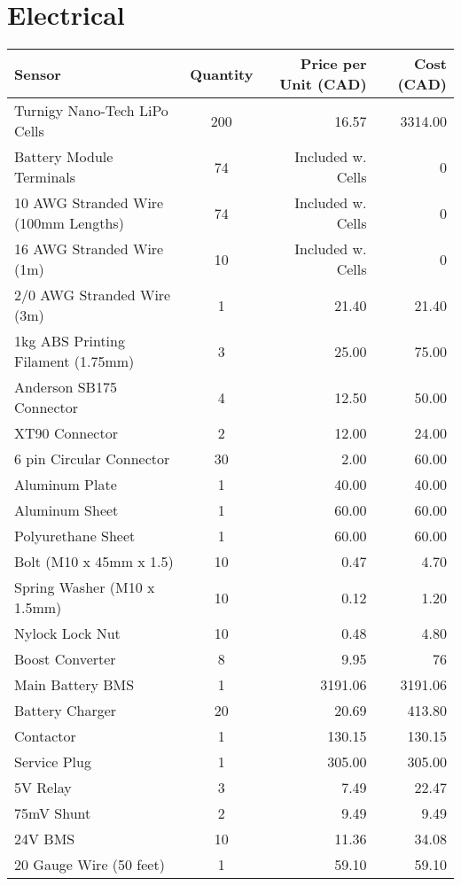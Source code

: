 \documentclass[main.tex]{subfiles}
\begin{document}
\section{Electrical}
\begin{table}[H]
  	  \centering
      \begin{tabular}{@{}lcrr@{}} \toprule
        Sensor & Quantity & Price per Unit (CAD) & Cost (CAD) \\ \midrule
        Turnigy Nano-Tech LiPo Cells& 200 & 16.57 & 3314.00 \\
        Battery Module Terminals& 74 & Included w. Cells & 0 \\
        10 AWG Stranded Wire (100mm Lengths) & 74 & Included w. Cells & 0\\
        16 AWG Stranded Wire (1m) & 10 & Included w. Cells & 0 \\
        2/0 AWG Stranded Wire (3m) & 1 & 21.40 & 21.40 \\
        1kg ABS Printing Filament (1.75mm)& 3 & 25.00 & 75.00 \\
        Anderson SB175 Connector& 4 & 12.50 &50.00 \\
        XT90 Connector& 2 & 12.00 & 24.00 \\
        6 pin Circular Connector& 30 &  2.00 &  60.00\\
        Aluminum Plate& 1 & 40.00 & 40.00 \\
        Aluminum Sheet& 1 & 60.00 & 60.00 \\
        Polyurethane Sheet& 1 & 60.00 & 60.00 \\
        Bolt (M10 x 45mm x 1.5)& 10 & 0.47 & 4.70 \\
        Spring Washer (M10 x 1.5mm)& 10 & 0.12 & 1.20 \\
        Nylock Lock Nut& 10 & 0.48 & 4.80\\
        Boost Converter& 8 & 9.95 & 76 \\
        Main Battery BMS& 1 & 3191.06 & 3191.06 \\
        Battery Charger& 20 & 20.69 & 413.80 \\
        Contactor& 1 & 130.15 & 130.15 \\
        Service Plug& 1 & 305.00 & 305.00 \\
        5V Relay & 3 & 7.49 & 22.47 \\
        75mV Shunt& 2 & 9.49 & 9.49 \\
        24V BMS& 10 & 11.36 & 34.08 \\
        20 Gauge Wire (50 feet)& 1 & 59.10 & 59.10 \\

\end{tabular}
\end{table}
\end{document}
